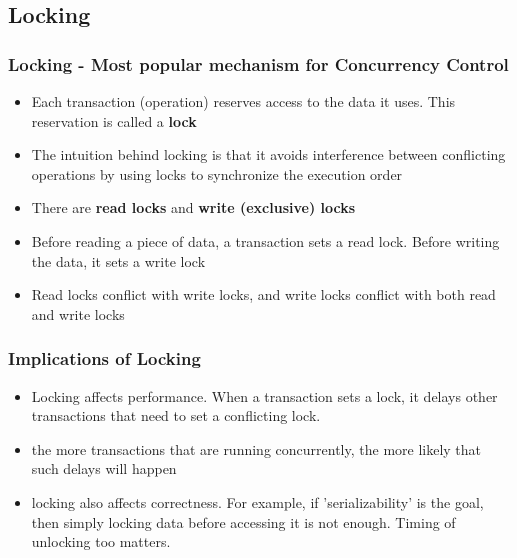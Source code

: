 \documentclass[12]{beamer}
\begin{document}
\subsection{Locking}

\begin{frame}
  \frametitle{Locking - Most popular mechanism for Concurrency Control}
  \begin{itemize}
     \addtolength{\itemsep}{0.5\baselineskip}
    \item Each transaction (operation) reserves access to the data it uses. This reservation is called a \textbf{lock}
    \item The intuition behind locking is that it avoids interference between conflicting operations by using locks to synchronize the execution order
    \item There are \textbf{read locks} and \textbf{write (exclusive) locks}
    \item Before reading a piece of data, a transaction sets a read lock. Before writing the data, it sets a write lock
    \item Read locks conflict with write locks, and write locks conflict with both read and write locks
  \end{itemize}
\end{frame}

\begin{frame}
  \frametitle{Implications of Locking}
  \begin{itemize}
    \item  Locking affects performance. When a transaction sets a lock, it delays other transactions that need to set a conflicting lock.
    \item the more transactions that are running concurrently, the more likely that such delays will happen
    \item locking also affects correctness. For example, if 'serializability' is the goal, then simply locking data before accessing it is not enough. Timing of unlocking too matters.
  \end{itemize}
\end{frame}
\end{document}
